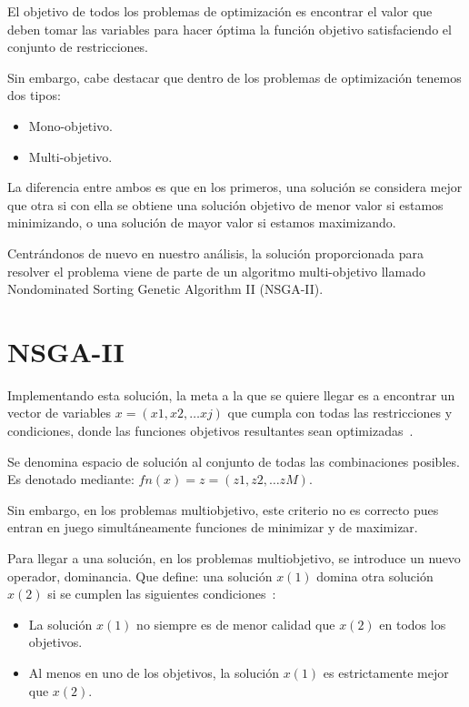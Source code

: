 El objetivo de todos los problemas de optimización es encontrar el valor que deben tomar las variables para hacer óptima la función objetivo satisfaciendo el conjunto de restricciones. 

Sin embargo, cabe destacar que dentro de los problemas de optimización tenemos dos tipos:
\begin{itemize}
	\item Mono-objetivo.
	\item Multi-objetivo.
\end{itemize}

La diferencia entre ambos es que en los primeros, una solución se considera mejor que otra si con ella se obtiene una solución objetivo de menor valor si estamos minimizando, o una solución de mayor valor si estamos maximizando.

Centrándonos de nuevo en nuestro análisis, la solución proporcionada para resolver el problema viene de parte de un algoritmo multi-objetivo llamado Nondominated Sorting Genetic Algorithm II (NSGA-II).

\section{NSGA-II}

Implementando esta solución, la meta a la que se quiere llegar es a encontrar un vector de variables $x=(x1,x2,…xj)$ que cumpla con todas las restricciones y condiciones, donde las funciones objetivos resultantes sean optimizadas~\cite{pdf:algoritmo}.

Se denomina espacio de solución al conjunto de todas las combinaciones posibles. Es denotado mediante: $fn(x)=z=(z1,z2,…zM)$. 

Sin embargo, en los problemas multiobjetivo, este criterio no es correcto pues entran en juego simultáneamente funciones de minimizar y de maximizar.

Para llegar a una solución, en los problemas multiobjetivo, se introduce un nuevo operador, dominancia. Que define: una solución 
$x(1)$ domina otra solución $x(2)$ si se cumplen las siguientes condiciones~\cite{pdf:nsga-ii}:

\begin{itemize}
	\item La solución $x(1)$ no siempre es de menor calidad que $x(2)$ en todos los objetivos.
	\item Al menos en uno de los objetivos, la solución $x(1)$ es estrictamente mejor que $x(2)$.
\end{itemize}

